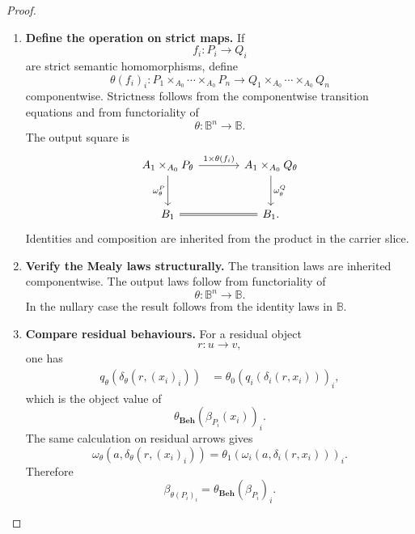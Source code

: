\begin{proof}
\begin{enumerate}
        For \(n=0\), the transition is
        \[
            \delta_\theta(a,v)=s_A(a),
        \]
        and the output map is the composite
        \[
            A_1
            \xrightarrow{!}
            1
            \xrightarrow{b_\theta}
            B_0
            \xrightarrow{e_B}
            B_1.
        \]
        In generalized-element notation,
        \[
            \omega_\theta(a,v)=e_B(b_\theta).
        \]

        \item \textbf{Define the operation on strict maps.}
        If
        \[
            f_i:P_i\to Q_i
        \]
        are strict semantic homomorphisms, define
        \[
            \theta(f_i)_i:
            P_1\times_{A_0}\cdots\times_{A_0}P_n
            \to
            Q_1\times_{A_0}\cdots\times_{A_0}Q_n
        \]
        componentwise. Strictness follows from the componentwise transition
        equations and from functoriality of
        \[
            \theta:\mathbb B^n\to\mathbb B.
        \]
        The output square is
        \[
        \begin{tikzcd}[column sep=large, row sep=large]
            A_1\times_{A_0}P_\theta
                \arrow[r, "{1\times\theta(f_i)}"]
                \arrow[d, "\omega_\theta^P"']
            &
            A_1\times_{A_0}Q_\theta
                \arrow[d, "\omega_\theta^Q"]
            \\
            B_1
                \arrow[r, equal]
            &
            B_1 .
        \end{tikzcd}
        \]
        Identities and composition are inherited from the product in the
        carrier slice.

        \item \textbf{Verify the Mealy laws structurally.}
        The transition laws are inherited componentwise. The output laws follow
        from functoriality of
        \[
            \theta:\mathbb B^n\to\mathbb B.
        \]
        In the nullary case the result follows from the identity laws in
        \(\mathbb B\).

        \item \textbf{Compare residual behaviours.}
        For a residual object
        \[
            r:u\to v,
        \]
        one has
        \[
        \begin{aligned}
            q_\theta(\delta_\theta(r,(x_i)_i))
            &=
            \theta_0(q_i(\delta_i(r,x_i)))_i,
        \end{aligned}
        \]
        which is the object value of
        \[
            \theta_{\mathbf{Beh}}(\beta_{P_i}(x_i))_i.
        \]
        The same calculation on residual arrows gives
        \[
            \omega_\theta(a,\delta_\theta(r,(x_i)_i))
            =
            \theta_1(\omega_i(a,\delta_i(r,x_i)))_i.
        \]
        Therefore
        \[
            \beta_{\theta(P_i)_i}
            =
            \theta_{\mathbf{Beh}}(\beta_{P_i})_i.
        \]
    \end{enumerate}
\end{proof}

